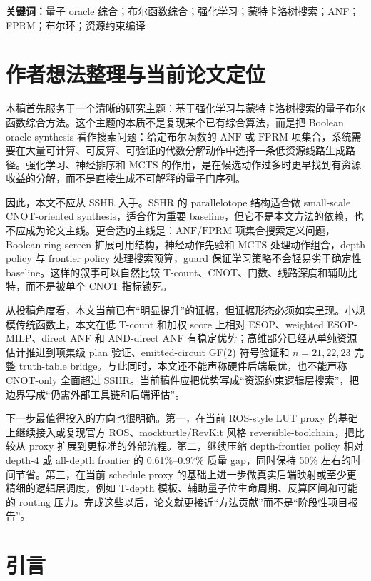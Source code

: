 \documentclass[UTF8,fontset=macnew,11pt]{ctexart}
\newcommand{\anf}{\ensuremath{\mathrm{ANF}}}
\newcommand{\fprm}{\ensuremath{\mathrm{FPRM}}}
\newcommand{\mcts}{\ensuremath{\mathrm{MCTS}}}
\newcommand{\ttable}{truth-table}
\begin{document}
\noindent\textbf{关键词：}量子 oracle 综合；布尔函数综合；强化学习；蒙特卡洛树搜索；ANF；FPRM；布尔环；资源约束编译

\section*{作者想法整理与当前论文定位}

本稿首先服务于一个清晰的研究主题：基于强化学习与蒙特卡洛树搜索的量子布尔函数综合方法。这个主题的本质不是复现某个已有综合算法，而是把 Boolean oracle synthesis 看作搜索问题：给定布尔函数的 \anf{} 或 \fprm{} 项集合，系统需要在大量可计算、可反算、可验证的代数分解动作中选择一条低资源线路生成路径。强化学习、神经排序和 \mcts{} 的作用，是在候选动作过多时更早找到有资源收益的分解，而不是直接生成不可解释的量子门序列。

因此，本文不应从 SSHR 入手。SSHR 的 parallelotope 结构适合做 small-scale CNOT-oriented synthesis，适合作为重要 baseline，但它不是本文方法的依赖，也不应成为论文主线。更合适的主线是：\anf{}/\fprm{} 项集合搜索定义问题，Boolean-ring screen 扩展可用结构，神经动作先验和 \mcts{} 处理动作组合，depth policy 与 frontier policy 处理搜索预算，guard 保证学习策略不会轻易劣于确定性 baseline。这样的叙事可以自然比较 T-count、CNOT、门数、线路深度和辅助比特，而不是被单个 CNOT 指标锁死。

从投稿角度看，本文当前已有“明显提升”的证据，但证据形态必须如实呈现。小规模传统函数上，本文在低 T-count 和加权 score 上相对 ESOP、weighted ESOP-MILP、direct ANF 和 AND-direct ANF 有稳定优势；高维部分已经从单纯资源估计推进到项集级 plan 验证、emitted-circuit GF(2) 符号验证和 $n=21,22,23$ 完整 \ttable{} bridge。与此同时，本文还不能声称硬件后端最优，也不能声称 CNOT-only 全面超过 SSHR。当前稿件应把优势写成“资源约束逻辑层搜索”，把边界写成“仍需外部工具链和后端评估”。

下一步最值得投入的方向也很明确。第一，在当前 ROS-style LUT proxy 的基础上继续接入或复现官方 ROS、mockturtle/RevKit 风格 reversible-toolchain，把比较从 proxy 扩展到更标准的外部流程。第二，继续压缩 depth-frontier policy 相对 depth-4 或 all-depth frontier 的 0.61\%--0.97\% 质量 gap，同时保持 50\% 左右的时间节省。第三，在当前 schedule proxy 的基础上进一步做真实后端映射或至少更精细的逻辑层调度，例如 T-depth 模板、辅助量子位生命周期、反算区间和可能的 routing 压力。完成这些以后，论文就更接近“方法贡献”而不是“阶段性项目报告”。

\section{引言}
\end{document}
